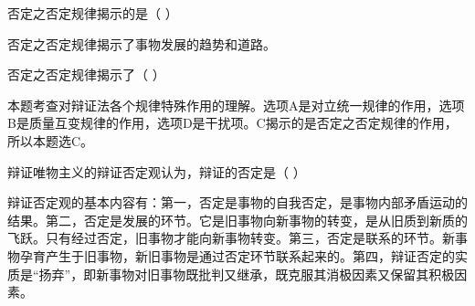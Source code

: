 \question 否定之否定规律揭示的是（ ）
\par{}
\begin{solution}否定之否定规律揭示了事物发展的趋势和道路。
\end{solution}
\question 否定之否定规律揭示了（ ）
\par{}
\begin{solution}本题考查对辩证法各个规律特殊作用的理解。选项A是对立统一规律的作用，选项B是质量互变规律的作用，选项D是干扰项。C揭示的是否定之否定规律的作用，所以本题选C。
\end{solution}
\question 辩证唯物主义的辩证否定观认为，辩证的否定是（ ）
\par\twoch{\textcolor{red}{事物的自我否定}}{\textcolor{red}{联系的环节}}{\textcolor{red}{发展的环节}}{\textcolor{red}{扬弃}}
\begin{solution}辩证否定观的基本内容有：第一，否定是事物的自我否定，是事物内部矛盾运动的结果。第二，否定是发展的环节。它是旧事物向新事物的转变，是从旧质到新质的飞跃。只有经过否定，旧事物才能向新事物转变。第三，否定是联系的环节。新事物孕育产生于旧事物，新旧事物是通过否定环节联系起来的。第四，辩证否定的实质是``扬弃''，即新事物对旧事物既批判又继承，既克服其消极因素又保留其积极因素。
\end{solution}
